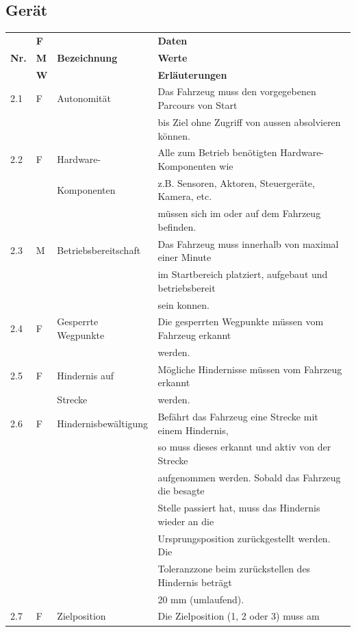 \documentclass[../main.tex]{subfiles}
\begin{document}
\subsection{Gerät}
\begin{tabular}{|l|l|l|l|}
  \hline
  & \textbf{F} & & \textbf{Daten} \\
  \textbf{Nr.} & \textbf{M} & \textbf{Bezeichnung} & \textbf{Werte} \\
  & \textbf{W} & & \textbf{Erläuterungen} \\
  \hline
  2.1 & F & Autonomität & Das Fahrzeug muss den vorgegebenen Parcours
  von Start \\
  & & & bis Ziel ohne Zugriff von aussen absolvieren können. \\
  \hline
  2.2 & F & Hardware- & Alle zum Betrieb benötigten Hardware-Komponenten wie \\
  & & Komponenten & z.B. Sensoren, Aktoren, Steuergeräte, Kamera, etc. \\
  & & & müssen sich im oder auf dem Fahrzeug befinden. \\
  \hline
  2.3 & M & Betriebsbereitschaft & Das Fahrzeug muss innerhalb von
  maximal einer Minute \\
  & & & im Startbereich platziert, aufgebaut und betriebsbereit \\
  & & & sein konnen. \\
  \hline
  2.4 & F &  Gesperrte Wegpunkte & Die gesperrten Wegpunkte müssen
  vom Fahrzeug erkannt \\
  & & & werden. \\
  \hline
  2.5 & F & Hindernis auf & Mögliche Hindernisse müssen vom Fahrzeug erkannt \\
  & & Strecke & werden. \\
  \hline
  2.6 & F & Hindernisbewältigung & Befährt das Fahrzeug eine Strecke
  mit einem Hindernis, \\
  & & & so muss dieses erkannt und aktiv von der Strecke \\
  & & & aufgenommen werden. Sobald das Fahrzeug die besagte \\
  & & & Stelle passiert hat, muss das Hindernis wieder an die \\
  & & & Ursprungsposition zurückgestellt werden. Die \\
  & & & Toleranzzone beim zurückstellen des Hindernis beträgt \\
  & & & 20 mm (umlaufend). \\
  \hline
  2.7 & F & Zielposition & Die Zielposition (1, 2 oder 3) muss am

\end{tabular}
\end{document}
